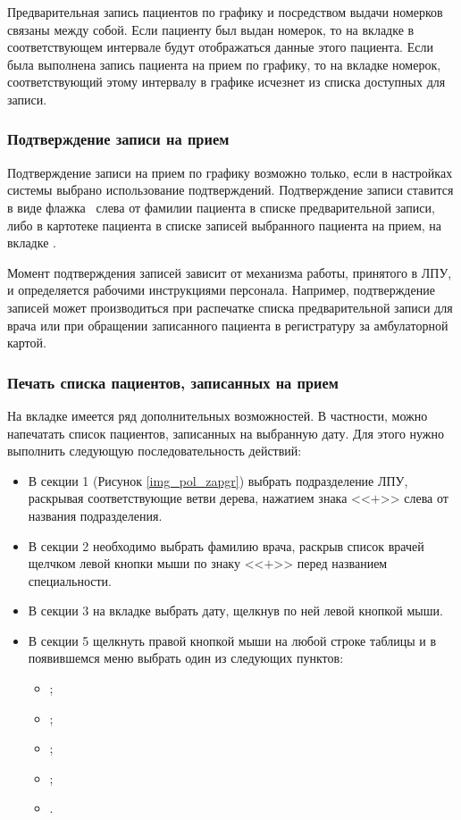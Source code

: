 Предварительная запись пациентов по графику и посредством выдачи номерков связаны между собой. Если пациенту был выдан номерок, то на вкладке  в соответствующем интервале будут отображаться данные этого пациента. Если была выполнена запись пациента на прием по графику, то на вкладке  номерок, соответствующий этому интервалу в графике исчезнет из списка доступных для записи.

\subsubsection{Подтверждение записи на прием}

Подтверждение записи на прием по графику возможно только, если в настройках системы выбрано использование подтверждений. Подтверждение записи ставится в виде флажка \putx~слева от фамилии пациента в списке предварительной записи, либо в картотеке пациента в списке записей выбранного пациента на прием, на вкладке .

Момент подтверждения записей зависит от механизма работы, принятого в ЛПУ, и определяется рабочими инструкциями персонала. Например, подтверждение записей может производиться при распечатке списка предварительной записи для врача или при обращении записанного пациента в регистратуру за амбулаторной картой.

\subsubsection{Печать списка пациентов, записанных на прием} \label{pol_zaplist}

На вкладке  имеется ряд дополнительных возможностей. В частности, можно напечатать список пациентов, записанных на выбранную дату. Для этого нужно выполнить следующую последовательность действий:
\begin{itemize}
 \item В секции 1 (Рисунок \ref{img_pol_zapgr}) выбрать подразделение ЛПУ, раскрывая соответствующие ветви дерева, нажатием знака <<$+$>> слева от названия подразделения.
 \item В секции 2 необходимо выбрать фамилию врача, раскрыв список врачей щелчком левой кнопки мыши по знаку <<$+$>> перед названием специальности.
 \item В секции 3 на вкладке  выбрать дату, щелкнув по ней левой кнопкой мыши.
 \item В секции 5 щелкнуть правой кнопкой мыши на любой строке таблицы и в появившемся меню выбрать один из следующих пунктов:
 \begin{itemize}
  \item {};
  \item {};
  \item {};
  \item {};
  \item {}.
 \end{itemize}  
\end{itemize} 

